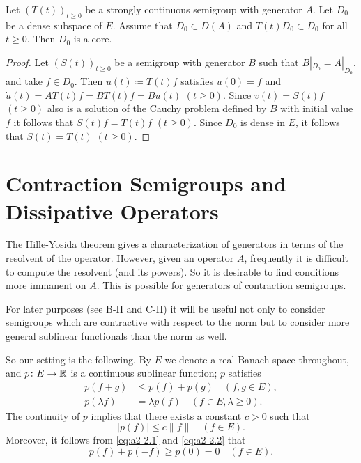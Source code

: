 \begin{corollary}\label{cor:a2-1.34}
Let $(T(t))_{t\geq 0}$ be a strongly continuous semigroup with generator $A$.
Let $D_{0}$ be a dense subspace of $E$.
Assume that $D_{0} \subset D(A)$ and $T(t)D_{0} \subset D_{0}$ for all $t \geq 0$.
Then $D_{0}$ is a core.
\end{corollary}

\begin{proof}
Let $(S(t))_{t\geq 0}$ be a semigroup with generator $B$ such that $B|_{D_{0}} = A|_{D_{0}}$, and take $f \in D_{0}$.
Then $u(t) \coloneqq T(t)f$ satisfies $u(0) = f$ and $\dot{u}(t) = AT(t)f = BT(t)f = Bu(t)$ $(t \geq 0)$.
Since $v(t) = S(t)f$ $(t \geq 0)$ also is a solution of the Cauchy problem defined by $B$ with initial value $f$ it follows that $S(t)f = T(t)f$ $(t\geq 0)$.
Since $D_{0}$ is dense in $E$, it follows that $S(t) = T(t)$ $(t \geq 0)$.
\end{proof}
\section{Contraction Semigroups and Dissipative Operators}\label{sec:a2-2}
\hspace{1cm}{\Large by Wolfgang Arendt}
\vspace{.5cm}
\newline
The Hille-Yosida theorem gives a characterization of generators in terms of the resolvent of the operator.
However, given an operator $A$, frequently it is difficult to compute the resolvent (and its powers).
So it is desirable to find conditions more immanent on $A$.
This is possible for generators of contraction semigroups.

For later purposes (see B-II and C-II) it will be useful not only to consider semigroups which are contractive with respect to the norm but to consider more general sublinear functionals than the norm as well.

So our setting is the following.
By $E$ we denote a real Banach space throughout, and $p \colon E \to \mathbb{R}$ is a continuous sublinear function; \ie $p$ satisfies
\begin{align}
p(f+g) &\leq p(f) + p(g) \quad (f, g \in E), \label{eq:a2-2.1} \\
p(\lambda f) &= \lambda p(f) \quad (f \in E, \lambda \geq 0).\label{eq:a2-2.2}
\end{align}
The continuity of $p$ implies that there exists a constant $c > 0$ such that
\begin{equation}\label{eq:a2-2.3}
|p(f)| \leq c\|f\| \quad (f \in E).
\end{equation}
Moreover, it follows from \eqref{eq:a2-2.1} and \eqref{eq:a2-2.2} that
\begin{equation}\label{eq:a2-2.4}
p(f) + p(-f) \geq p(0) = 0 \quad (f \in E).
\end{equation}

